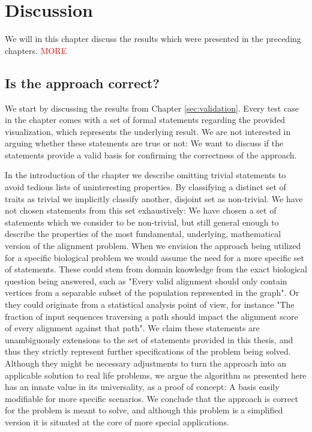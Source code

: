 \documentclass[thesis.tex]{subfiles}
\begin{document}
\chapter{Discussion}
\label{sec:discussion}
We will in this chapter discuss the results which were presented in the preceding chapters. \textcolor{red}{MORE}
\section{Is the approach correct?}
We start by discussing the results from Chapter \ref{sec:validation}. Every test case in the chapter comes with a set of formal statements regarding the provided visualization, which represents the underlying result. We are not interested in arguing whether these statements are true or not: We want to discuss if the statements provide a valid basis for confirming the correctness of the approach. \\
\par\noindent
In the introduction of the chapter we describe omitting trivial statements to avoid tedious lists of uninteresting properties. By classifying a distinct set of traits as trivial we implicitly classify another, disjoint set as non-trivial. We have not chosen statements from this set exhaustively: We have chosen a set of statements which we consider to be non-trivial, but still general enough to describe the properties of the most fundamental, underlying, mathematical version of the alignment problem. When we envision the approach being utilized for a specific biological problem we would assume the need for a more specific set of statements. These could stem from domain knowledge from the exact biological question being answered, such as "Every valid alignment should only contain vertices from a separable subset of the population represented in the graph". Or they could originate from a statistical analysis point of view, for instance "The fraction of input sequences traversing a path should impact the alignment score of every alignment against that path". We claim these statements are unambiguously extensions to the set of statements provided in this thesis, and thus they strictly represent further specifications of the problem being solved. Although they might be necessary adjustments to turn the approach into an applicable solution to real life problems, we argue the algorithm as presented here has an innate value in its universality, as a proof of concept: A basis easily modifiable for more specific scenarios. We conclude that the approach is correct for the problem is meant to solve, and although this problem is a simplified version it is situated at the core of more special applications.
\end{document}

